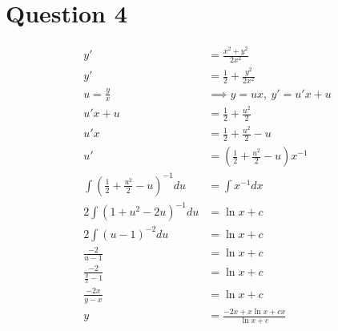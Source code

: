 \documentclass{article}
\begin{document}
\section*{Question 4}
\begin{align*}
    y'                                         & =\frac{x^2+y^2}{2x^2}                \\
    y'                                         & =\frac{1}{2}+\frac{y^2}{2x^2}        \\
    u =\frac{y}{x}                             & \implies y=ux,\ y'=u'x+u             \\
    u'x+u                                      & =\frac{1}{2}+\frac{u^2}{2}           \\
    u'x                                        & =\frac{1}{2}+\frac{u^2}{2}-u         \\
    u'                                         & =(\frac{1}{2}+\frac{u^2}{2}-u)x^{-1} \\
    \int (\frac{1}{2}+\frac{u^2}{2}-u)^{-1} du & =\int x^{-1}dx                       \\
    2\int (1+u^2-2u)^{-1} du                   & =\ln x+c                             \\
    2\int (u-1)^{-2} du                        & =\ln x+c                             \\
    \frac{-2}{u-1}                             & =\ln x+c                             \\
    \frac{-2}{\frac{y}{x}-1}                   & =\ln x+c                             \\
    \frac{-2x}{y-x}                            & =\ln x+c                             \\
    y                                          & =\frac{-2x+x\ln x + cx}{\ln x + c}
\end{align*}
\end{document}
